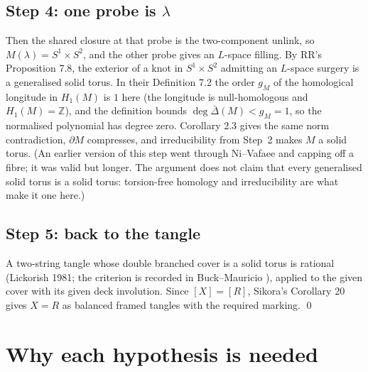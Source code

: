 \documentclass[11pt]{amsart}
\theoremstyle{remark}
\newcommand{\Z}{\mathbb{Z}}
\begin{document}
\subsection*{Step 4: one probe is $\lambda$}
Then the shared closure at that probe is the two-component unlink, so $M(\lambda)=S^1\times S^2$, and the other probe gives an $L$-space filling. By RR's Proposition 7.8, the exterior of a knot in $S^1\times S^2$ admitting an $L$-space surgery is a generalised solid torus. In their Definition 7.2 the order $g_M$ of the homological longitude in $H_1(M)$ is $1$ here (the longitude is null-homologous and $H_1(M)=\Z$), and the definition bounds $\deg\bar\Delta(M)<g_M=1$, so the normalised polynomial has degree zero. Corollary 2.3 gives the same norm contradiction, $\partial M$ compresses, and irreducibility from Step~2 makes $M$ a solid torus. (An earlier version of this step went through Ni--Vafaee and capping off a fibre; it was valid but longer. The argument does not claim that every generalised solid torus is a solid torus: torsion-free homology and irreducibility are what make it one here.)

\subsection*{Step 5: back to the tangle}
A two-string tangle whose double branched cover is a solid torus is rational (Lickorish 1981; the criterion is recorded in Buck--Mauricio \cite[Thm.~3.5(2)]{BM}), applied to the given cover with its given deck involution. Since $[X]=[R]$, Sikora's Corollary 20 gives $X=R$ as balanced framed tangles with the required marking. \qed

\section{Why each hypothesis is needed}
\end{document}
